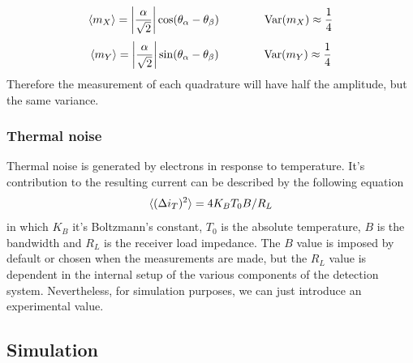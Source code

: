 %
\begin{equation}
\braket{m_X} = \left|\frac{\alpha}{\sqrt{2}}\right| \cos({\theta_\alpha - \theta_\beta})
\qquad
\qquad
\textrm{Var}(m_X) \approx \frac{1}{4}
\end{equation}
%
%
\begin{equation}
\braket{m_Y} =  \left|\frac{\alpha}{\sqrt{2}}\right| \sin({\theta_\alpha - \theta_\beta})
\qquad
\qquad
\textrm{Var}(m_Y) \approx \frac{1}{4}
\end{equation}
%
Therefore the measurement of each quadrature will have half the amplitude, but the same variance.
%
%
%
\subsubsection{Thermal noise}
Thermal noise is generated by electrons in response to temperature. It's contribution to the resulting current can be described by the following equation
\cite{fox2006}
%
\begin{equation}
\braket{(\Delta i_T)^2} = 4 K_B T_0 B/R_L
\end{equation}
%
in which $K_B$ it's Boltzmann's constant, $T_0$ is the absolute temperature, $B$ is the bandwidth and $R_L$ is the receiver load impedance. The $B$ value is imposed by default or chosen when the measurements are made, but the $R_L$ value is dependent in the internal setup of the various components of the detection system. Nevertheless, for simulation purposes, we can just introduce an experimental value.\\
\vspace{1cm}
%
%
\subsection{Simulation}

